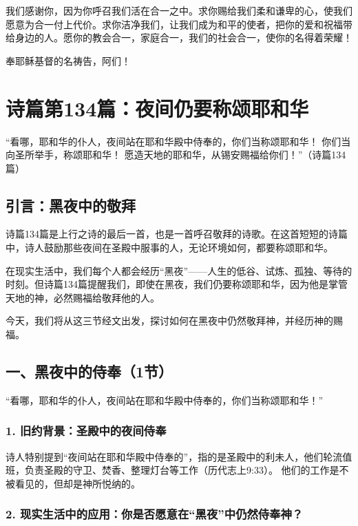\documentclass[a4paper, 12pt]{article}
\begin{document}
我们感谢你，因为你呼召我们活在合一之中。求你赐给我们柔和谦卑的心，使我们愿意为合一付上代价。求你洁净我们，让我们成为和平的使者，把你的爱和祝福带给身边的人。愿你的教会合一，家庭合一，我们的社会合一，使你的名得着荣耀！

奉耶稣基督的名祷告，阿们！
\newpage
\section{诗篇第134篇：夜间仍要称颂耶和华}


“看哪，耶和华的仆人，夜间站在耶和华殿中侍奉的，你们当称颂耶和华！
你们当向圣所举手，称颂耶和华！
愿造天地的耶和华，从锡安赐福给你们！”（诗篇134篇）

\subsection*{引言：黑夜中的敬拜}
\hspace{0.6cm}诗篇134篇是上行之诗的最后一首，也是一首呼召敬拜的诗歌。在这首短短的诗篇中，诗人鼓励那些夜间在圣殿中服事的人，无论环境如何，都要称颂耶和华。

在现实生活中，我们每个人都会经历“黑夜”——人生的低谷、试炼、孤独、等待的时刻。但诗篇134篇提醒我们，即使在黑夜，我们仍要称颂耶和华，因为他是掌管天地的神，必然赐福给敬拜他的人。

今天，我们将从这三节经文出发，探讨如何在黑夜中仍然敬拜神，并经历神的赐福。

\subsection*{一、黑夜中的侍奉（1节）}
“看哪，耶和华的仆人，夜间站在耶和华殿中侍奉的，你们当称颂耶和华！”

\subsubsection*{1. 旧约背景：圣殿中的夜间侍奉}
诗人特别提到“夜间站在耶和华殿中侍奉的”，指的是圣殿中的利未人，他们轮流值班，负责圣殿的守卫、焚香、整理灯台等工作（历代志上9:33）。
他们的工作是不被看见的，但却是神所悦纳的。
\subsubsection*{2. 现实生活中的应用：你是否愿意在“黑夜”中仍然侍奉神？}
\end{document}
